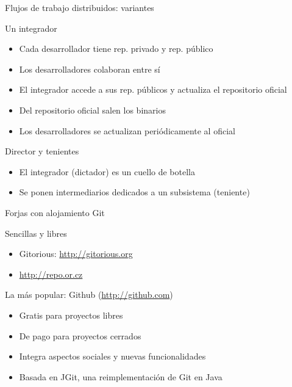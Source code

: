 \documentclass[xcolor=svgnames]{beamer}
\begin{document}
\begin{frame}{Flujos de trabajo distribuidos: variantes}

  \begin{block}{Un integrador}
    \begin{itemize}
    \item Cada desarrollador tiene rep. privado y rep. público
    \item Los desarrolladores colaboran entre sí
    \item El integrador accede a sus rep. públicos y actualiza el
      repositorio oficial
    \item Del repositorio oficial salen los binarios
    \item Los desarrolladores se actualizan periódicamente al oficial
    \end{itemize}
  \end{block}

  \begin{block}{Director y tenientes}
    \begin{itemize}
    \item El integrador (dictador) es un cuello de botella
    \item Se ponen intermediarios dedicados a un subsistema (teniente)
    \end{itemize}
  \end{block}

\end{frame}

\begin{frame}{Forjas con alojamiento Git}

  \begin{block}{Sencillas y libres}
    \begin{itemize}
    \item Gitorious: \url{http://gitorious.org}
    \item \url{http://repo.or.cz}
    \end{itemize}
  \end{block}

  \begin{block}{La más popular: Github (\url{http://github.com})}
    \begin{itemize}
    \item Gratis para proyectos libres
    \item De pago para proyectos cerrados
    \item Integra aspectos sociales y nuevas funcionalidades
    \item Basada en JGit, una reimplementación de Git en Java
    \end{itemize}
  \end{block}

\end{frame}
\end{document}
